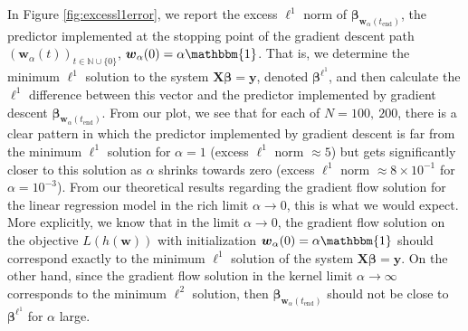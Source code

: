 \documentclass{article}
\begin{document}
In Figure \ref{fig:excessl1error}, we report the excess $\ell^1$ norm of $\boldsymbol{\beta}_{\boldsymbol{w}_{\alpha}(t_{\text{end}})}$, the predictor implemented at the stopping point of the gradient descent path $(\boldsymbol{w}_{\alpha}(t))_{t \in \mathbb{N}\cup \{0\}}$, $\boldsymbol{w}_{\alpha}(0) = \alpha \mathbbm{1}$. That is, we determine the minimum $\ell^1$ solution to the system $\boldsymbol{X} \boldsymbol{\beta} = \boldsymbol{y}$, denoted $\boldsymbol{\beta}^{\ell^1}$, and then calculate the $\ell^1$ difference between this vector and the predictor implemented by gradient descent $\boldsymbol{\beta}_{\boldsymbol{w}_{\alpha}(t_{\text{end}})}$. From our plot, we see that for each of $N= 100, \ 200$, there is a clear pattern in which the predictor implemented by gradient descent is far from the minimum $\ell^1$ solution for $\alpha =1$ (excess $\ell^1$ norm $\approx5$) but gets significantly closer to this solution as $\alpha$ shrinks towards zero (excess $\ell^1$ norm $\approx 8\times 10^{-1}$ for $\alpha = 10^{-3}$). From our theoretical results regarding the gradient flow solution for the linear regression model in the rich limit $\alpha \rightarrow 0$, this is what we would expect. More explicitly, we know that in the limit $\alpha \rightarrow 0$, the gradient flow solution on the objective $L(h(\boldsymbol{w}))$ with initialization $\boldsymbol{w}_{\alpha}(0) = \alpha \mathbbm{1}$ should correspond exactly to the minimum $\ell^1$ solution of the system $\boldsymbol{X} \boldsymbol{\beta} = \boldsymbol{y}$. On the other hand, since the gradient flow solution in the kernel limit $\alpha \rightarrow \infty$ corresponds to the minimum $\ell^2$ solution, then $\boldsymbol{\beta}_{\boldsymbol{w}_{\alpha}(t_{\text{end}})}$ should not be close to $\boldsymbol{\beta}^{\ell^1}$ for $\alpha$ large.
\end{document}
